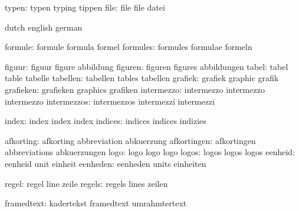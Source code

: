               typen:  typen                typing              tippen
               file:  file                 file                datei

\stopvariables




\startvariables       dutch                english             german

            formule:  formule              formula             formel
           formules:  formules             formulae            formeln

             figuur:  figuur               figure              abbildung
            figuren:  figuren              figures             abbildungen
              tabel:  tabel                table               tabelle
           tabellen:  tabellen             tables              tabellen
            grafiek:  grafiek              graphic             grafik
          grafieken:  grafieken            graphics            grafiken
         intermezzo:  intermezzo           intermezzo          intermezzo
        intermezzos:  intermezzos          intermezzi          intermezzi

              index:  index                index               index
            indices:  indices              indices             indizies

          afkorting:  afkorting            abbreviation        abkuerzung
        afkortingen:  afkortingen          abbreviations       abkuerzungen
               logo:  logo                 logo                logo
              logos:  logos                logos               logos
            eenheid:  eenheid              unit                einheit
           eenheden:  eenheden             units               einheiten

              regel:  regel                line                zeile
             regels:  regels               lines               zeilen

         framedtext:  kadertekst           framedtext          umrahmtertext

\stopvariables



